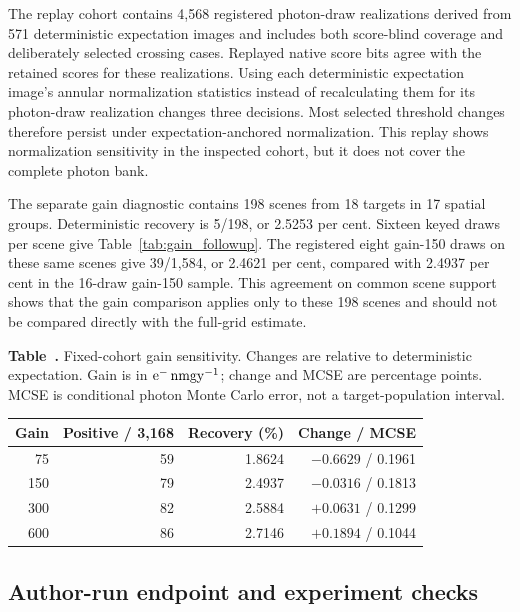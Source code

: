 The replay cohort contains 4,568 registered photon-draw realizations derived
from 571 deterministic expectation images and includes both score-blind
coverage and deliberately selected crossing cases. Replayed native score bits
agree with the retained scores for these realizations. Using each deterministic
expectation image's annular normalization statistics instead of recalculating
them for its photon-draw realization changes three decisions. Most selected
threshold changes therefore persist under expectation-anchored normalization.
This replay shows normalization sensitivity in the inspected cohort, but it
does not cover the complete photon bank.

\newpage
The separate gain diagnostic contains 198 scenes from 18 targets in 17
spatial groups. Deterministic recovery is 5/198, or 2.5253 per cent. Sixteen
keyed draws per scene give Table~\ref{tab:gain_followup}. The registered eight
gain-150 draws on these same scenes give 39/1,584, or 2.4621 per cent,
compared with 2.4937 per cent in the 16-draw gain-150 sample. This agreement on
common scene support shows that the gain comparison applies only to these 198
scenes and should not be compared directly with the full-grid estimate.

\medskip
{}\label{tab:gain_followup}
\noindent\textbf{Table~\thetable.} Fixed-cohort gain sensitivity. Changes are
relative to deterministic expectation. Gain is in
\({\rm e^{-}\,nmgy^{-1}}\); change and MCSE are percentage points. MCSE is
conditional photon Monte Carlo error, not a target-population interval.
\begin{center}
\small
\begin{tabular}{rrrr}
\toprule
Gain & Positive / 3,168 & Recovery (\%) & Change / MCSE \\
\midrule
75  & 59 & 1.8624 & \(-0.6629\) / 0.1961 \\
150 & 79 & 2.4937 & \(-0.0316\) / 0.1813 \\
300 & 82 & 2.5884 & \(+0.0631\) / 0.1299 \\
600 & 86 & 2.7146 & \(+0.1894\) / 0.1044 \\
\bottomrule
\end{tabular}
\end{center}

\subsection{Author-run endpoint and experiment checks}

